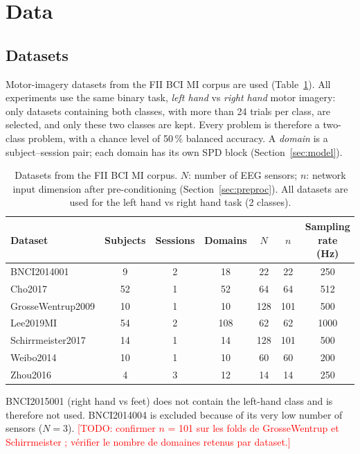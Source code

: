 \documentclass[11pt,a4paper]{article}
\newcommand{\todo}[1]{\textcolor{red}{[TODO: #1]}}
\begin{document}
\section{Data}
\label{sec:data}

\subsection{Datasets}
Motor-imagery datasets from the FII BCI MI corpus are used (Table~\ref{tab:datasets}).
All experiments use the same binary task, \emph{left hand} vs \emph{right hand} motor
imagery: only datasets containing both classes, with more than 24 trials per class, are
selected, and only these two classes are kept. Every problem is therefore a two-class
problem, with a chance level of 50\,\% balanced accuracy.
A \emph{domain} is a subject--session pair; each domain has its own SPD block
(Section~\ref{sec:model}).

\begin{table}[h]
\centering
\caption{Datasets from the FII BCI MI corpus. $N$: number of EEG sensors;
$n$: network input dimension after pre-conditioning (Section~\ref{sec:preproc}).
All datasets are used for the left hand vs right hand task (2 classes).}
\label{tab:datasets}
\small
\begin{tabular}{lcccccc}
\toprule
Dataset & Subjects & Sessions & Domains & $N$ & $n$ & Sampling rate (Hz) \\
\midrule
BNCI2014001        & 9  & 2 & 18  & 22  & 22  & 250  \\
Cho2017            & 52 & 1 & 52  & 64  & 64  & 512  \\
GrosseWentrup2009  & 10 & 1 & 10  & 128 & 101 & 500  \\
Lee2019MI          & 54 & 2 & 108 & 62  & 62  & 1000 \\
Schirrmeister2017  & 14 & 1 & 14  & 128 & 101 & 500  \\
Weibo2014          & 10 & 1 & 10  & 60  & 60  & 200  \\
Zhou2016           & 4  & 3 & 12  & 14  & 14  & 250  \\
\bottomrule
\end{tabular}
\end{table}

BNCI2015001 (right hand vs feet) does not contain the left-hand class and is therefore not
used. BNCI2014004 is excluded because of its very low number of sensors ($N = 3$).
\todo{confirmer $n$ = 101 sur les folds de GrosseWentrup et Schirrmeister ; vérifier le nombre de domaines retenus par dataset.}
\end{document}

